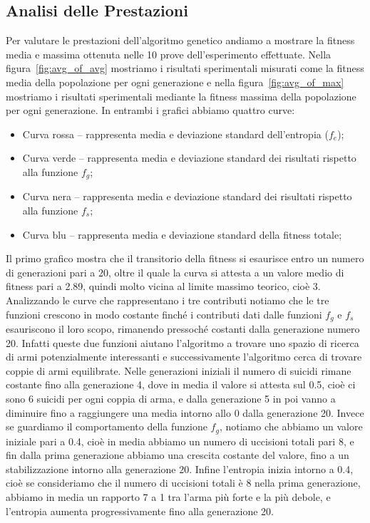 \documentclass[12pt, italian]{toptesi}
\begin{document}
\subsection{Analisi delle Prestazioni}
Per valutare le prestazioni dell'algoritmo genetico andiamo a mostrare la fitness media e massima ottenuta nelle 10 prove dell'esperimento effettuate.
Nella figura~\ref{fig:avg_of_avg} mostriamo i risultati sperimentali misurati come la fitness media della popolazione per ogni generazione e nella figura~\ref{fig:avg_of_max} mostriamo i risultati sperimentali mediante la fitness massima della popolazione per ogni generazione.
In entrambi i grafici abbiamo quattro curve:
\begin{itemize}
\item Curva rossa -- rappresenta media e deviazione standard dell'entropia ($f_e$);
\item Curva verde -- rappresenta media e deviazione standard dei risultati rispetto alla funzione $f_g$;
\item Curva nera -- rappresenta media e deviazione standard dei risultati rispetto alla funzione $f_s$;
\item Curva blu -- rappresenta media e deviazione standard della fitness totale;
\end{itemize}
Il primo grafico mostra che il transitorio della fitness si esaurisce entro un numero di generazioni pari a 20, oltre il quale la curva si attesta a un valore medio di fitness pari a 2.89, quindi molto vicina al limite massimo teorico, cioè 3.
Analizzando le curve che rappresentano i tre contributi notiamo che le tre funzioni crescono in modo costante finché i contributi dati dalle funzioni $f_g$ e $f_s$ esauriscono il loro scopo, rimanendo pressoché costanti dalla generazione numero 20. Infatti queste due funzioni aiutano l'algoritmo a trovare uno spazio di ricerca di armi potenzialmente interessanti e successivamente l'algoritmo cerca di trovare coppie di armi equilibrate.
Nelle generazioni iniziali il numero di suicidi rimane costante fino alla generazione 4, dove in media il valore si attesta sul 0.5, cioè ci sono 6 suicidi per ogni coppia di arma, e dalla generazione 5 in poi vanno a diminuire fino a raggiungere una media intorno allo 0 dalla generazione 20.
Invece se guardiamo il comportamento della funzione $f_g$, notiamo che abbiamo un valore iniziale pari a 0.4, cioè in media abbiamo un numero di uccisioni totali pari 8, e fin dalla prima generazione abbiamo una crescita costante del valore, fino a un stabilizzazione intorno alla generazione 20.
Infine l'entropia inizia intorno a 0.4, cioè se consideriamo che il numero di uccisioni totali è 8 nella prima generazione, abbiamo in media un rapporto 7 a 1 tra l'arma più forte e la più debole, e l'entropia aumenta progressivamente fino alla generazione 20.
\end{document}
